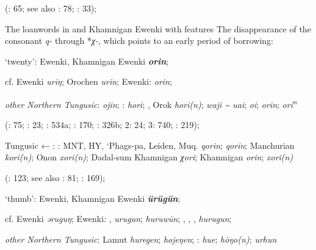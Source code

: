 \documentclass[output=paper,colorlinks,citecolor=brown]{langscibook}
\begin{document}
    (\citealt{Khabtagaeva2017}: 65; see also \citealt{Doerfer1985}: 78; \citealt{Rozycki1994}: 33);
\z
\z

\ea
The  loanwords in  and Khamnigan Ewenki with  features
\ea The disappearance of the  consonant \textit{q-} through *\textit{χ-}, which points to an early period of borrowing:

\ea ‘twenty’:  Ewenki, Khamnigan Ewenki \textbf{\textit{orin}};

    cf.  Ewenki \textit{uriŋ}; Orochen \textit{urin};  Ewenki:  \textit{orin};

    \textit{other Northern Tungusic}:  \textit{ojin}; \textit{}:  \textit{hori}; , Orok \textit{hori(n)};  \textit{waji {\textasciitilde} uai};  \textit{oi};  \textit{orin};  \textit{ori\textsuperscript{n}} 
    
    (\citealt{Castrén1856}: 75; \citealt{Janhunen1991}: 23; \citealt{Dorji1998}: 534a; \citealt{Chaoke2014a}: 170; \citealt{Vasilevic1958}: 326b; \citealt{Cincius1975B} 2: 24; \citealt{Hauer1952} 3: 740; \citealt{Zikmundová2013a}: 219);

    Tungusic ← : : MNT, HY, ‘Phags-pa, Leiden, Muq. \textit{qorin};  \textit{qorin}; Manchurian  \textit{kori(n)}; Onon  \textit{xori(n)}; Dadal-sum Khamnigan \textit{χori};  Khamnigan \textit{orin};  \textit{xori(n)}
    
    (\citealt{Khabtagaeva2017}: 123; see also \citealt{Doerfer1985}: 81; \citealt{Rozycki1994}: 169);

    \ex ‘thumb’:  Ewenki, Khamnigan Ewenki \textbf{\textit{ürügün}};

    cf.  Ewenki \textit{ǝruguŋ};  Ewenki: ,  \textit{urugun};  \textit{huruwūn}; , , ,  \textit{hurugun};

    \textit{other Northern Tungusic}: Lamut \textit{huregen};  \textit{hojeŋen}; \textit{}:  \textit{hue};  \textit{hōŋo(n)};  \textit{urhun}
    
\end{document}
